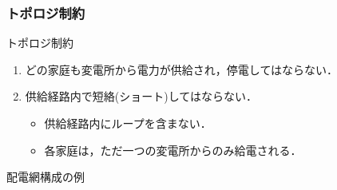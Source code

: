 \documentclass[dvipdfmx,11pt]{beamer}
\begin{document}
\begin{frame}\frametitle{トポロジ制約}

 \begin{block}{トポロジ制約}
  \begin{enumerate}
   \item どの家庭も変電所から電力が供給され，\alert{停電}してはならない．
   \item 供給経路内で\alert{短絡(ショート)}してはならない．
		 \begin{itemize}
		  \item 供給経路内にループを含まない．
		  \item 各家庭は，ただ一つの変電所からのみ給電される．
		 \end{itemize}
  \end{enumerate}
 \end{block}

 \begin{exampleblock}{配電網構成の例}
  \begin{columns}
   \begin{column}{0.45\textwidth}
	\centering
   \end{column}
   \begin{column}{0.45\textwidth}
	\centering
   \end{column}
  \end{columns}

 \end{exampleblock}
 
\end{frame}
\end{document}
